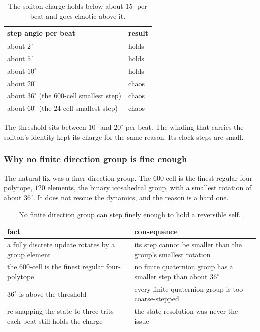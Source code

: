 \begin{table}[ht]
\centering
\begin{tabular}{@{}ll@{}}
\toprule
step angle per beat & result \\
\midrule
about $2^\circ$ & holds \\
about $5^\circ$ & holds \\
about $10^\circ$ & holds \\
about $20^\circ$ & chaos \\
about $36^\circ$ (the $600$-cell smallest step) & chaos \\
about $60^\circ$ (the $24$-cell smallest step) & chaos \\
\bottomrule
\end{tabular}
\caption{The soliton charge holds below about $15^\circ$ per beat and goes chaotic above it.}
\label{tab:threshold}
\end{table}

The threshold sits between $10^\circ$ and $20^\circ$ per beat. The winding that carries the soliton's identity kept its charge for the same reason. Its clock steps are small.

\subsubsection{Why no finite direction group is fine enough}

The natural fix was a finer direction group. The $600$-cell is the finest regular four-polytope, $120$ elements, the binary icosahedral group, with a smallest rotation of about $36^\circ$. It does not rescue the dynamics, and the reason is a hard one.

\begin{table}[ht]
\centering
\begin{tabular}{@{}ll@{}}
\toprule
fact & consequence \\
\midrule
a fully discrete update rotates by a group element & its step cannot be smaller than the group's smallest rotation \\
the $600$-cell is the finest regular four-polytope & no finite quaternion group has a smaller step than about $36^\circ$ \\
$36^\circ$ is above the threshold & every finite quaternion group is too coarse-stepped \\
re-snapping the state to three trits each beat still holds the charge & the state resolution was never the issue \\
\bottomrule
\end{tabular}
\caption{No finite direction group can step finely enough to hold a reversible self.}
\label{tab:fine-group}
\end{table}


